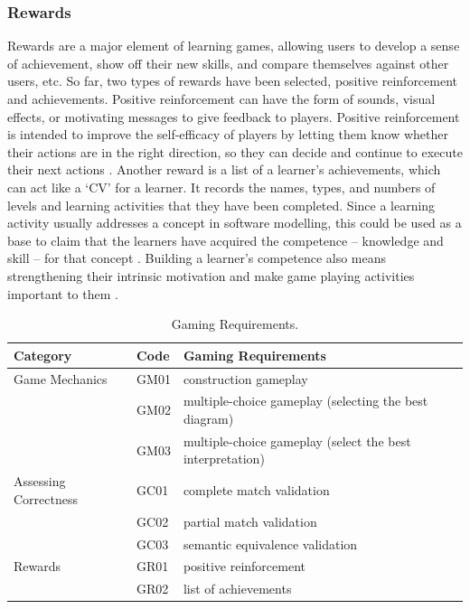 \documentclass[12pt, a4paper]{report} \usepackage[titletoc]{appendix}
\begin{document}
\subsubsection{Rewards}
\label{Rewards}
Rewards are a major element of learning games, allowing users to develop a sense of achievement, show off their new skills, and compare themselves against other users, etc. So far, two types of rewards have been selected, positive reinforcement and achievements. Positive reinforcement can have the form of sounds, visual effects, or motivating messages to give feedback to players. Positive reinforcement is intended to improve the self-efficacy of players by letting them know whether their actions are in the right direction, so they can decide and continue to execute their next actions \cite{richter2015studying}. Another reward is a list of a learner's achievements, which can act like a `CV' for a learner. It records the names, types, and numbers of levels and learning activities that they have been completed. Since a learning activity usually addresses a concept in software modelling, this could be used as a base to claim that the learners have acquired the competence -- knowledge and skill -- for that concept \cite{richter2015studying}. Building a learner's competence also means strengthening their intrinsic motivation \cite{ryan2017self} and make game playing  activities important to them \cite{nicholson2015recipe}.

\begin{table}[t!]
\caption{Gaming Requirements.}
\label{gaming-requirements}
\begin{center}
\begin{tabular}{ p{2cm}p{1cm}p{10cm} } 
\hline
Category & Code & Gaming Requirements\\
\hline
\multirow{1}{2cm}{Game Mechanics}
& GM01 & construction gameplay \cite{arnab2015mapping}\\
& GM02 & multiple-choice gameplay (selecting the best diagram)\\
& GM03 & multiple-choice gameplay (select the best interpretation)\\
\hline
\multirow{1}{2cm}{Assessing Correctness}
& GC01 & complete match validation\\
& GC02 & partial match validation\\
& GC03 & semantic equivalence validation\\
\hline
\multirow{1}{2cm}{Rewards}
& GR01 & positive reinforcement \cite{richter2015studying}\\
& GR02 & list of achievements \cite{richter2015studying}\\
\hline
\end{tabular}
\end{center}
\end{table}
\end{document}
